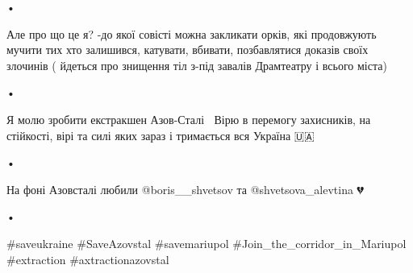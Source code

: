 •

Але про що це я? -до якої совісті можна закликати орків, які продовжують мучити
тих хто залишився, катувати, вбивати, позбавлятися доказів своїх злочинів (
йдеться про знищення тіл з-під завалів Драмтеатру і всього міста)

•

Я молю зробити екстракшен Азов-Сталі🙏🏻 Вірю в перемогу захисників, на
стійкості, вірі та силі яких зараз і тримається вся Україна 🇺🇦 💪🏻

•

На фоні Азовсталі любили @boris\_\_shvetsov  та @shvetsova\_alevtina 💔

•

\#saveukraine 
\#SaveAzovstal \#savemariupol 
\#Join\_the\_corridor\_in\_Mariupol 
\#extraction \#axtractionazovstal


